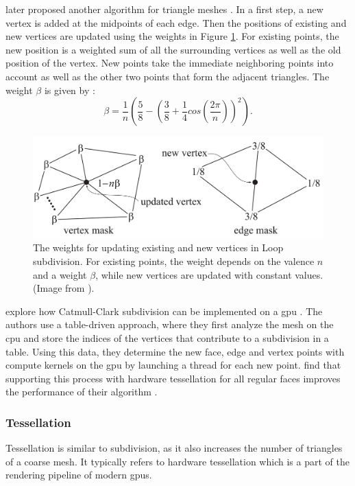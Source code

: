 \citeauthor{loop_subdivision} later proposed another algorithm for triangle meshes \cite{loop_subdivision}.
In a first step, a new vertex is added at the midpoints of each edge.
Then the positions of existing and new vertices are updated using the weights in Figure \ref{fig:loop_subdivision}.
For existing points, the new position is a weighted sum of all the surrounding vertices as well as the old position of the vertex.
New points take the immediate neighboring points into account as well as the other two points that form the adjacent triangles.
The weight $\beta$ is given by \cite{loop_subdivision}:
\begin{equation*}
    \beta = \frac{1}{n}(\frac{5}{8} - (\frac{3}{8} + \frac{1}{4}cos(\frac{2\pi}{n}))^2).
\end{equation*}
\begin{figure}[t]
    \centering
    \includegraphics[width=0.5\linewidth]{img/loop_subdivision.png}
    \caption[Weights in Loop subdivision]{The weights for updating existing and new vertices in Loop subdivision. For existing points, the weight depends on the valence $n$ and a weight $\beta$, while new vertices are updated with constant values. (Image from \cite{realtime}).}
    \label{fig:loop_subdivision}
\end{figure}

\citeauthor{niessner_subdivision} explore how Catmull-Clark subdivision can be implemented on a \ac{gpu} \cite{niessner_subdivision}.
The authors use a table-driven approach, where they first analyze the mesh on the \ac{cpu} and store the indices of the vertices that contribute to a subdivision in a table.
Using this data, they determine the new face, edge and vertex points with compute kernels on the \ac{gpu} by launching a thread for each new point.
\citeauthor{niessner_subdivision} find that supporting this process with hardware tessellation for all regular faces improves the performance of their algorithm \cite{niessner_subdivision}.


\subsubsection*{Tessellation}
Tessellation is similar to subdivision, as it also increases the number of triangles of a coarse mesh.
It typically refers to hardware tessellation which is a part of the rendering pipeline of modern \acp{gpu}.


